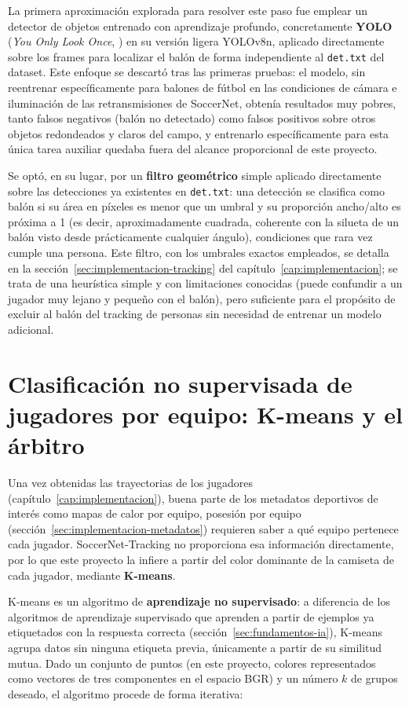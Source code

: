 La primera aproximación explorada para resolver este paso fue emplear un
detector de objetos entrenado con aprendizaje profundo, concretamente
\textbf{YOLO} (\emph{You Only Look Once}, \citealp{redmon2016yolo, ultralytics2026yolov8}) en su
versión ligera YOLOv8n, aplicado directamente sobre los frames para
localizar el balón de forma independiente al \texttt{det.txt} del dataset.
Este enfoque se descartó tras las primeras pruebas: el modelo, sin
reentrenar específicamente para balones de fútbol en las condiciones de
cámara e iluminación de las retransmisiones de SoccerNet, obtenía
resultados muy pobres, tanto falsos negativos (balón no detectado) como
falsos positivos sobre otros objetos redondeados y claros del campo, y
entrenarlo específicamente para esta única tarea auxiliar quedaba fuera del
alcance proporcional de este proyecto.

Se optó, en su lugar, por un \textbf{filtro geométrico} simple aplicado
directamente sobre las detecciones ya existentes en \texttt{det.txt}: una
detección se clasifica como balón si su área en píxeles es menor que un
umbral y su proporción ancho/alto es próxima a 1 (es decir, aproximadamente
cuadrada, coherente con la silueta de un balón visto desde prácticamente
cualquier ángulo), condiciones que rara vez cumple una persona. Este
filtro, con los umbrales exactos empleados, se detalla en la
sección~\ref{sec:implementacion-tracking} del
capítulo~\ref{cap:implementacion}; se trata de una heurística simple y con
limitaciones conocidas (puede confundir a un jugador muy lejano y pequeño
con el balón), pero suficiente para el propósito de excluir al balón del
tracking de personas sin necesidad de entrenar un modelo adicional.

\section{Clasificación no supervisada de jugadores por equipo: K-means y el árbitro}
\label{sec:fundamentos-kmeans}

Una vez obtenidas las trayectorias de los jugadores (capítulo~\ref{cap:implementacion}),
buena parte de los metadatos deportivos de interés como mapas de calor por
equipo, posesión por equipo (sección~\ref{sec:implementacion-metadatos})
requieren saber a qué equipo pertenece cada jugador. SoccerNet-Tracking no
proporciona esa información directamente, por lo que este proyecto la
infiere a partir del color dominante de la camiseta de cada jugador,
mediante \textbf{K-means}.

K-means \citep{ibm2026kmeans} es un algoritmo de \textbf{aprendizaje no
supervisado}: a diferencia de los algoritmos de aprendizaje supervisado que
aprenden a partir de ejemplos ya etiquetados con la respuesta correcta
(sección~\ref{sec:fundamentos-ia}), K-means agrupa datos sin ninguna
etiqueta previa, únicamente a partir de su similitud mutua. Dado un
conjunto de puntos (en este proyecto, colores representados como vectores
de tres componentes en el espacio BGR) y un número $k$ de grupos deseado,
el algoritmo procede de forma iterativa:

